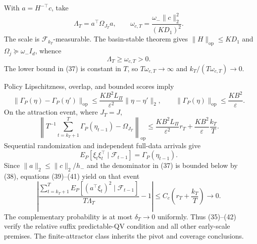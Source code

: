 With \(a=H^{-\top}c\), take
\[
 \Lambda_T=a^\top\Omega_{J_T}a,\qquad
 \omega_{c,T}=\frac{\omega_-\|c\|_2^2}{(KD_1)^2}.
\tag{37}
\]
The scale is \(\mathcal F_{k_T}\)-measurable. The basin-stable theorem gives \(\|H\|_{\mathrm{op}}\le KD_1\) and \(\Omega_j\succeq\omega_-I_d\), whence
\[
 \Lambda_T\ge\omega_{c,T}>0.
\tag{38}
\]
The lower bound in (37) is constant in \(T\), so \(T\omega_{c,T}\to\infty\) and \(k_T/(T\omega_{c,T})\to0\).

Policy Lipschitzness, overlap, and bounded scores imply
\[
 \|\Gamma_P(\eta)-\Gamma_P(\eta')\|_{\mathrm{op}}
 \le\frac{KB^2L_\Pi}{\varepsilon^2}\|\eta-\eta'\|_2,
 \qquad \|\Gamma_P(\eta)\|_{\mathrm{op}}\le\frac{KB^2}{\varepsilon}.
\tag{39}
\]
On the attraction event, where \(J_T=J\),
\[
 \left\|T^{-1}\sum_{t=k_T+1}^T\Gamma_P(\eta_{t-1})-
 \Omega_{J_T}\right\|_{\mathrm{op}}
 \le\frac{KB^2L_\Pi}{\varepsilon^2}r_T
 +\frac{KB^2}{\varepsilon}\frac{k_T}{T}.
\tag{40}
\]
Sequential randomization and independent full-data arrivals give
\[
 E_P[\xi_t\xi_t^\top\mid\mathcal F_{t-1}]
 =\Gamma_P(\eta_{t-1}).
\tag{41}
\]
Since \(\|a\|_2\le\|c\|_2/h_-\) and the denominator in (37) is bounded below by (38), equations (39)--(41) yield on that event
\[
 \left|
 \frac{\sum_{t=k_T+1}^TE_P[(a^\top\xi_t)^2\mid\mathcal F_{t-1}]}
 {T\Lambda_T}-1\right|
 \le C_c\left(r_T+\frac{k_T}{T}\right)\longrightarrow0.
\tag{42}
\]
The complementary probability is at most \(\delta_T\to0\) uniformly. Thus (35)--(42) verify the relative suffix predictable-QV condition and all other early-scale premises. The finite-attractor class inherits the pivot and coverage conclusions.